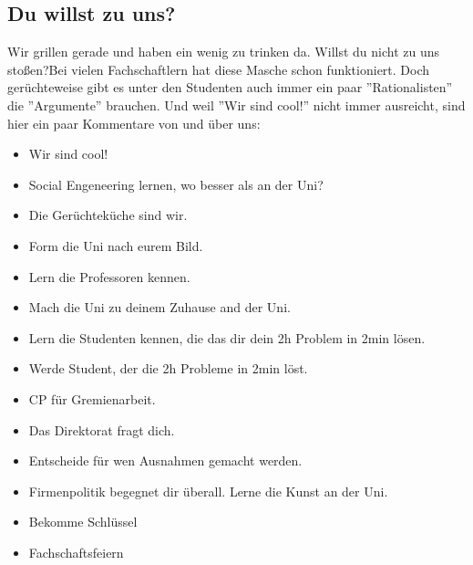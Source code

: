 \documentclass[12pt,a4paper]{scrartcl}
\begin{document}
	\subsection{Du willst zu uns?}
		\glqq Wir grillen gerade und haben ein wenig zu trinken da. Willst du nicht zu uns stoßen?\grqq { }Bei vielen Fachschaftlern hat diese Masche schon funktioniert. Doch gerüchteweise gibt es unter den Studenten auch immer ein paar ''Rationalisten'' die ''Argumente'' brauchen. Und weil ''Wir sind cool!'' nicht immer ausreicht, sind hier ein paar Kommentare von und über uns:
		\begin{itemize}
			\item Wir sind cool!
			\item Social Engeneering lernen, wo besser als an der Uni?
			\item Die Gerüchteküche sind wir.
			\item Form die Uni nach eurem Bild.
			\item Lern die Professoren kennen.
			\item Mach die Uni zu deinem Zuhause and der Uni.
			\item Lern die Studenten kennen, die das dir dein 2h Problem in 2min lösen.
			\item Werde Student, der die 2h Probleme in 2min löst.
			\item CP für Gremienarbeit.
			\item Das Direktorat fragt dich.
			\item Entscheide für wen Ausnahmen gemacht werden.
			\item Firmenpolitik begegnet dir überall. Lerne die Kunst an der Uni.
			\item Bekomme Schlüssel
			\item Fachschaftsfeiern
		\end{itemize}

	
	
\end{document}
